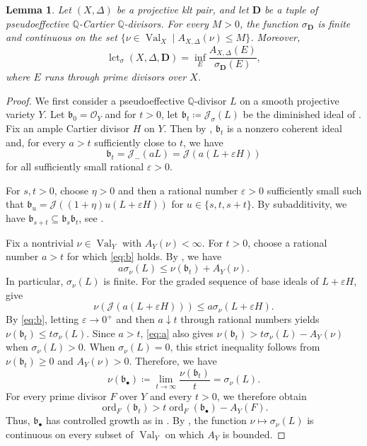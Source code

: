 \documentclass[a4paper,12pt]{amsart}
\newtheorem{lemma}[theorem]{Lemma}
\theoremstyle{plain}
\theoremstyle{definition}
\numberwithin{equation}{section}
\newcommand{\Q}{\mathbb{Q}}
\newcommand{\OO}{\mathcal{O}}
\DeclareMathOperator{\ord}{ord}
\DeclareMathOperator{\Val}{Val}
\def\lct{\operatorname{lct}}
\begin{document}
\begin{lemma}\label{lem:div}
    Let $(X,\Delta)$ be a projective klt pair, and let $\mathbf{D}$ be a tuple of pseudoeffective $\Q$-Cartier $\Q$-divisors. For every $M>0$, the function $\sigma_{\mathbf{D}}$ is finite and continuous on the set $\{\nu\in\Val_X\mid A_{X,\Delta}(\nu)\leq M\}$. Moreover,
    \[
    \lct_{\sigma}(X,\Delta,\mathbf{D})=\inf_E \frac{A_{X,\Delta}(E)}{\sigma_{\mathbf{D}}(E)},
    \]
    where $E$ runs through prime divisors over $X$. 
\end{lemma}
\begin{proof}
    We first consider a pseudoeffective $\Q$-divisor $L$ on a smooth projective variety $Y$. Let $\mathfrak{b}_0=\OO_Y$ and for $t>0$, let $\mathfrak{b}_t\coloneqq \mathcal{J}_{\sigma}(L)$ be the diminished ideal of \cite[Definition 6.2]{Leh}. Fix an ample Cartier divisor $H$ on $Y$. Then by \cite[Theorem 4.2 and Definitions 4.3 and 6.2]{Leh}, $\mathfrak{b}_t$ is a nonzero coherent ideal and, for every $a>t$ sufficiently close to $t$, we have
    \begin{equation}\label{eq:b}
        \mathfrak{b}_t=\mathcal{J}_{-}(aL)=\mathcal{J}(a(L+\varepsilon H))
    \end{equation}
    for all sufficiently small rational $\varepsilon>0$.

    For $s,t>0$, choose $\eta>0$ and then a rational number $\varepsilon>0$ sufficiently small such that $\mathfrak{b}_u=\mathcal{J}((1+\eta)u(L+\varepsilon H))$ for $u\in \{s,t,s+t\}$. By subadditivity, we have $\mathfrak{b}_{s+t}\subseteq \mathfrak{b}_s\mathfrak{b}_t$, see \cite[Section 2.3]{JM12}. 

    Fix a nontrivial $\nu\in \Val_Y$ with $A_Y(\nu)<\infty$. For $t>0$, choose a rational number $a>t$ for which \eqref{eq:b} holds. By \cite[Proposition 4.7]{Leh}, we have
    \begin{equation}\label{eq:a}
        a\sigma_{\nu}(L)\leq \nu(\mathfrak{b}_t)+A_Y(\nu).
    \end{equation}
    In particular, $\sigma_{\nu}(L)$ is finite. For the graded sequence of base ideals of $L+\varepsilon H$, \cite[Lemma 2.6 and Proposition 6.2]{JM12} give
    \[
    \nu(\mathcal{J}(a(L+\varepsilon H)))\leq a\sigma_{\nu}(L+\varepsilon H).
    \]
    By \eqref{eq:b}, letting $\varepsilon\to 0^+$ and then $a\downarrow t$ through rational numbers yields $\nu(\mathfrak{b}_t)\leq t\sigma_{\nu}(L)$. Since $a>t$, \eqref{eq:a} also gives $\nu(\mathfrak{b}_t)>t\sigma_{\nu}(L)-A_Y(\nu)$ when $\sigma_{\nu}(L)>0$. When $\sigma_{\nu}(L)=0$, this strict inequality follows from $\nu(\mathfrak{b}_t)\geq 0$ and $A_Y(\nu)>0$. Therefore, we have
    \[
    \nu(\mathfrak{b}_{\bullet})\coloneqq \lim_{t\to\infty} \frac{\nu(\mathfrak{b}_t)}{t}=\sigma_{\nu}(L).
    \]
    For every prime divisor $F$ over $Y$ and every $t>0$, we therefore obtain 
    \[
    \ord_F(\mathfrak{b}_t)>t\ord_F(\mathfrak{b}_{\bullet})-A_Y(F).
    \]
    Thus, $\mathfrak{b}_{\bullet}$ has controlled growth as in \cite[Definition 2.9]{JM12}. By \cite[Corollary 6.6]{JM12}, the function $\nu\mapsto \sigma_{\nu}(L)$ is continuous on every subset of $\Val_Y$ on which $A_Y$ is bounded.


\end{proof}
\end{document}
